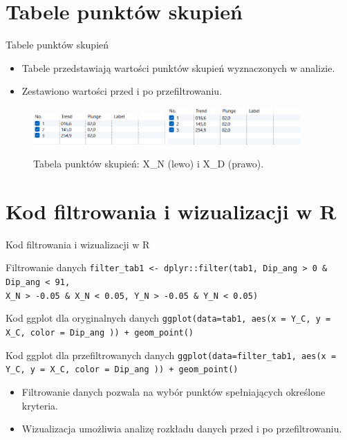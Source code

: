 \documentclass{beamer}
\begin{document}
\section{Tabele punktów skupień}
\begin{frame}{Tabele punktów skupień}
    \begin{itemize}
        \item Tabele przedstawiają wartości punktów skupień wyznaczonych w analizie.
        \item Zestawiono wartości przed i po przefiltrowaniu.
    \end{itemize}
    \begin{figure}
        \centering
        \includegraphics[width=0.45\textwidth]{X_N_measure.png}
        \includegraphics[width=0.45\textwidth]{X_D_measure.png}
        \caption{Tabela punktów skupień: X\_N (lewo) i X\_D (prawo).}
    \end{figure}
\end{frame}


\section{Kod filtrowania i wizualizacji w R}
\begin{frame}{Kod filtrowania i wizualizacji w R}
    \begin{block}{Filtrowanie danych}
        \texttt{filter\_tab1 <- dplyr::filter(tab1, Dip\_ang > 0 \& Dip\_ang < 91,}\\
        \texttt{X\_N > -0.05 \& X\_N < 0.05, Y\_N > -0.05 \& Y\_N < 0.05)}
    \end{block}
    \begin{block}{Kod ggplot dla oryginalnych danych}
        \texttt{ggplot(data=tab1, aes(x = Y\_C, y = X\_C, color = Dip\_ang )) + geom\_point()}
    \end{block}
    \begin{block}{Kod ggplot dla przefiltrowanych danych}
        \texttt{ggplot(data=filter\_tab1, aes(x = Y\_C, y = X\_C, color = Dip\_ang )) + geom\_point()}
    \end{block}
    \begin{itemize}
        \item Filtrowanie danych pozwala na wybór punktów spełniających określone kryteria.
        \item Wizualizacja umożliwia analizę rozkładu danych przed i po przefiltrowaniu.
    \end{itemize}
\end{frame}
\end{document}
